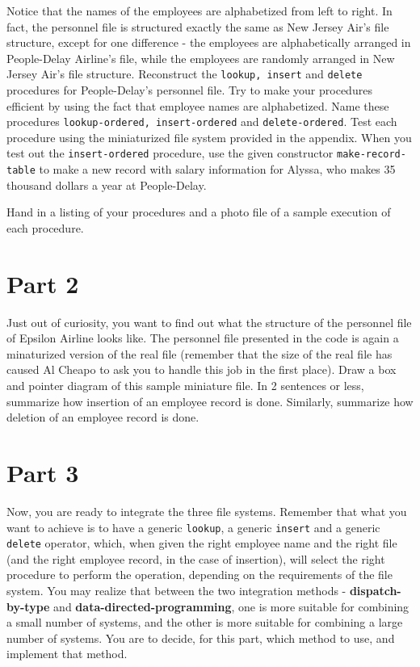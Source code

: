 Notice that the names of the employees are alphabetized from
left to right.  In fact, the personnel file is structured
exactly the same as New Jersey Air's file structure, except
for one difference - the employees are alphabetically
arranged in People-Delay Airline's file, while the employees
are randomly arranged in New Jersey Air's file structure.
Reconstruct the {\tt lookup, insert} and {\tt delete} procedures for
People-Delay's personnel file.  Try to make your procedures
efficient by using the fact that employee names are alphabetized.
Name these procedures {\tt lookup-ordered, insert-ordered} and
{\tt delete-ordered}.  Test each procedure using the miniaturized file
system provided in the appendix.
When you test out the {\tt insert-ordered}
procedure, use the given constructor {\tt make-record-table} to make a
new record with salary information for Alyssa, who makes 35 thousand
dollars a year at People-Delay.

Hand in a listing of your procedures and a photo file of
a sample execution of each procedure.

\section{Part 2}


Just out of curiosity,  you want to find out what the structure
of the personnel file of Epsilon Airline looks like.  The personnel
file presented in the code is again a minaturized version of the
real file (remember that the size of the real file has caused
Al Cheapo to ask you to handle this job in the first place).
Draw a box and pointer diagram of this sample miniature file.
In 2 sentences or less, summarize how insertion of an
employee record is done.  Similarly, summarize how deletion of an
employee record is done.

\section{Part 3}

Now, you are ready to integrate the three file
systems. Remember that what you want to achieve is to have a generic
{\tt lookup}, a generic {\tt insert} and a generic {\tt delete} operator,
which, when given the right employee name and the right file (and
the right employee record, in the case of insertion), will
select the right procedure to perform the operation, depending on the
requirements of the file system.
You may realize that between the two
integration methods - {\bf dispatch-by-type} and
{\bf data-directed-programming},
one is more suitable for combining a small number of systems,
and the other is more suitable for combining a large number
of systems.  You are to decide, for this part, which
method to use, and implement that method.

